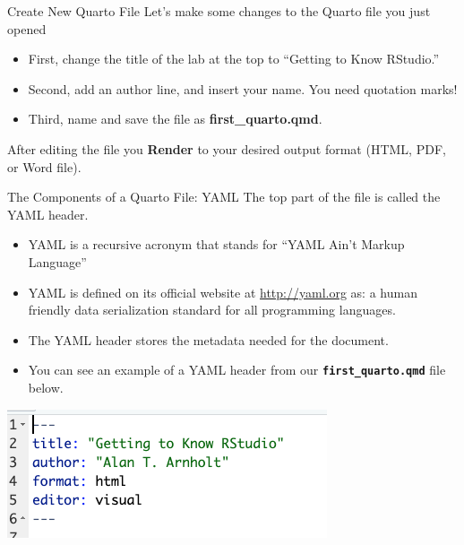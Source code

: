 \documentclass[
  ignorenonframetext,
]{beamer}
\providecommand{\tightlist}{%
  \setlength{\itemsep}{0pt}\setlength{\parskip}{0pt}}
\begin{document}
\begin{frame}{Create New Quarto File}
\protect\hypertarget{create-new-quarto-file-1}{}
Let's make some changes to the Quarto file you just opened

\begin{itemize}
\tightlist
\item
  First, change the title of the lab at the top to ``Getting to Know
  RStudio.''
\item
  Second, add an author line, and insert your name. You need quotation
  marks!
\item
  Third, name and save the file as \textbf{first\_quarto.qmd}.
\end{itemize}

After editing the file you \textbf{Render} to your desired output format
(HTML, PDF, or Word file).
\end{frame}

\begin{frame}[fragile]{The Components of a Quarto File: YAML}
\protect\hypertarget{the-components-of-a-quarto-file-yaml}{}
The top part of the file is called the YAML header.

\begin{itemize}
\item
  YAML is a recursive acronym that stands for ``YAML Ain't Markup
  Language''
\item
  YAML is defined on its official website at \url{http://yaml.org} as: a
  human friendly data serialization standard for all programming
  languages.
\item
  The YAML header stores the metadata needed for the document.
\item
  You can see an example of a YAML header from our
  \textbf{\texttt{first\_quarto.qmd}} file below.
\end{itemize}

\begin{center}\includegraphics[width=0.5\linewidth,height=0.2\textheight]{yaml} \end{center}
\end{frame}
\end{document}
